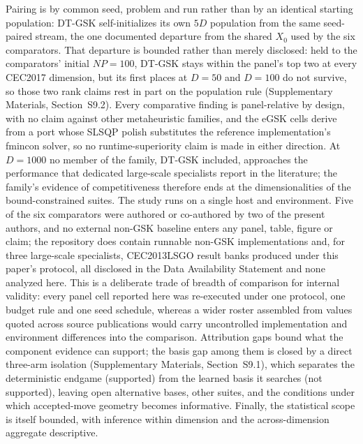 \documentclass[10pt,a4paper]{article}
\newcommand{\dtgsk}{DT-GSK}
\newcommand{\egsk}{eGSK}
\begin{document}
Pairing is by common seed, problem and run rather than by an identical
starting population: \dtgsk{} self-initializes its own $5D$ population from
the same seed-paired stream, the one documented departure from the shared
$X_{0}$ used by the six comparators. That departure is bounded rather than
merely disclosed: held to the comparators' initial $NP = 100$, \dtgsk{}
stays within the panel's top two at every CEC2017 dimension, but its first
places at $D = 50$ and $D = 100$ do not survive, so those two rank claims
rest in part on the population rule (Supplementary Materials,
Section~S9.2).
Every comparative finding is panel-relative by design, with no claim against
other metaheuristic families, and the \egsk{} cells derive from a port whose
SLSQP polish substitutes the reference implementation's fmincon solver, so no
runtime-superiority claim is made in either direction. At $D = 1000$ no
member of the family, \dtgsk{} included, approaches the performance that
dedicated large-scale specialists report in the literature; the family's
evidence of competitiveness therefore ends at the dimensionalities of the
bound-constrained
suites. 
The study runs on a single host and environment. Five of the six
comparators were authored or co-authored by two of the present authors, and no
external non-GSK baseline enters any panel, table, figure or claim;
the repository does contain runnable non-GSK implementations and, for
three large-scale specialists, CEC2013LSGO result banks produced under
this paper's protocol, all disclosed in the Data Availability Statement
and none analyzed
here. 
This is a deliberate trade of breadth of
comparison for internal validity: every panel cell reported here was re-executed
under one protocol, one budget rule and one seed schedule, whereas a wider
roster assembled from values quoted across source publications would carry
uncontrolled implementation and environment differences into the comparison. Attribution gaps bound what the
component evidence can support; the basis gap among them is closed by a
direct three-arm isolation (Supplementary Materials, Section~S9.1), which
separates the deterministic endgame
(supported) from the learned basis it searches (not supported), leaving open
alternative bases, other suites, and the conditions under which accepted-move
geometry becomes informative. Finally, the
statistical scope is itself bounded, with inference within dimension and the
across-dimension aggregate descriptive.
\end{document}
